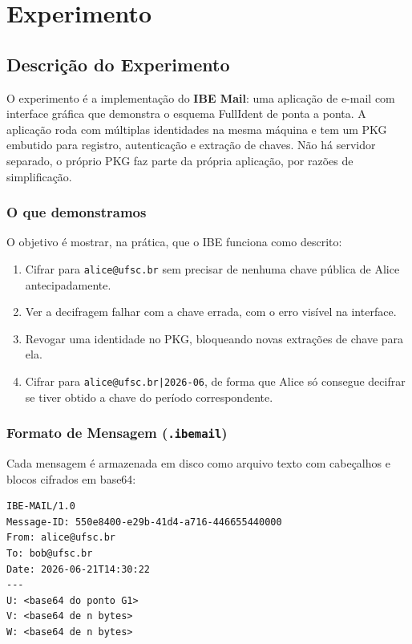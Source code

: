\chapter{Experimento}
\label{cap:experimento}

\section{Descrição do Experimento}
\label{sec:descricao}

O experimento é a implementação do \textbf{IBE Mail}: uma aplicação de e-mail com interface
gráfica que demonstra o esquema FullIdent de ponta a ponta. A aplicação roda com múltiplas
identidades na mesma máquina e tem um PKG embutido para registro, autenticação e extração de
chaves. Não há servidor separado, o próprio PKG faz parte da própria aplicação, por razões de
simplificação.

\subsection{O que demonstramos}

O objetivo é mostrar, na prática, que o IBE funciona como descrito:

\begin{enumerate}
  \item Cifrar para \texttt{alice@ufsc.br} sem precisar de nenhuma chave pública de Alice
    antecipadamente.

  \item Ver a decifragem falhar com a chave errada, com o erro visível na interface.

  \item Revogar uma identidade no PKG, bloqueando novas extrações de chave para ela.

  \item Cifrar para \texttt{alice@ufsc.br|2026-06}, de forma que Alice só consegue decifrar
    se tiver obtido a chave do período correspondente.
\end{enumerate}


\subsection{Formato de Mensagem (\texttt{.ibemail})}

Cada mensagem é armazenada em disco como arquivo texto com cabeçalhos e blocos cifrados em
base64:

\begin{verbatim}
IBE-MAIL/1.0
Message-ID: 550e8400-e29b-41d4-a716-446655440000
From: alice@ufsc.br
To: bob@ufsc.br
Date: 2026-06-21T14:30:22
---
U: <base64 do ponto G1>
V: <base64 de n bytes>
W: <base64 de n bytes>
\end{verbatim}

